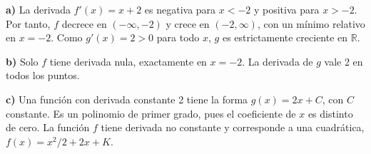 \textbf{a)} La derivada $f'(x)=x+2$ es negativa para $x<-2$ y positiva para $x>-2$. Por tanto, $f$ decrece en $(-\infty,-2)$ y crece en $(-2,\infty)$, con un mínimo relativo en $x=-2$. Como $g'(x)=2>0$ para todo $x$, $g$ es estrictamente creciente en $\mathbb R$.

\textbf{b)} Solo $f$ tiene derivada nula, exactamente en $x=-2$. La derivada de $g$ vale 2 en todos los puntos.

\textbf{c)} Una función con derivada constante 2 tiene la forma $g(x)=2x+C$, con $C$ constante. Es un polinomio de primer grado, pues el coeficiente de $x$ es distinto de cero. La función $f$ tiene derivada no constante y corresponde a una cuadrática, $f(x)=x^2/2+2x+K$.

